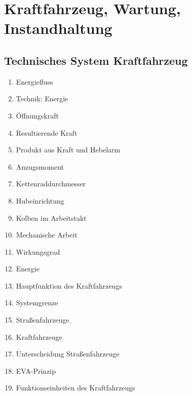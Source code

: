 \section{Kraftfahrzeug, Wartung,
Instandhaltung}\label{kraftfahrzeug-wartung-instandhaltung}

\subsection{Technisches System
Kraftfahrzeug}\label{technisches-system-kraftfahrzeug}

\begin{enumerate}
\item
  Energiefluss\\
\item
  Technik: Energie\\
\item
  Öffnungskraft\\
\item
  Resultierende Kraft\\
\item
  Produkt aus Kraft und Hebelarm\\
\item
  Anzugsmoment\\
\item
  Kettenraddurchmesser\\
\item
  Hubeinrichtung\\
\item
  Kolben im Arbeitstakt\\
\item
  Mechanische Arbeit\\
\item
  Wirkungsgrad\\
\item
  Energie\\
\item
  Hauptfunktion des Kraftfahrzeugs\\
\item
  Systemgrenze\\
\item
  Straßenfahrzeuge\\
\item
  Kraftfahrzeuge\\
\item
  Unterscheidung Straßenfahrzeuge\\
\item
  EVA-Prinzip\\
\item
  Funktionseinheiten des Kraftfahrzeugs
\end{enumerate}

